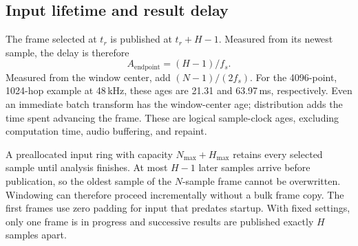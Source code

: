 \subsection{Input lifetime and result delay}
The frame selected at $t_r$ is published at $t_r+H-1$. Measured from its
newest sample, the delay is therefore
\begin{equation}
 A_{\mathrm{endpoint}}=(H-1)/f_s.
 \label{eq:age}
\end{equation}
Measured from the window center, add $(N-1)/(2f_s)$. For the 4096-point,
1024-hop example at 48\,kHz, these ages are 21.31 and 63.97\,ms,
respectively. Even an immediate batch transform has the window-center age;
distribution adds the time spent advancing the frame. These are logical
sample-clock ages, excluding computation time, audio buffering, and repaint.

A preallocated input ring with capacity $N_{\max}+H_{\max}$ retains every
selected sample until analysis finishes. At most $H-1$ later samples arrive
before publication, so the oldest sample of the $N$-sample frame cannot be
overwritten. Windowing can therefore proceed incrementally without a bulk
frame copy. The first frames use zero padding for input that predates startup.
With fixed settings, only one frame is in progress and successive results are
published exactly $H$ samples apart.
